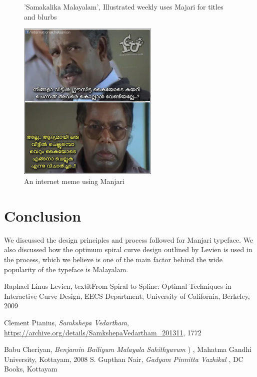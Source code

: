 \documentclass[11pt,twoside,a4paper,parskip=half]{scrartcl}
\begin{document}
\begin{figure}[h!]
\begin{subfigure}[b]{.45\textwidth}
	\end{subfigure}

	\caption{'Samakalika Malayalam', Illustrated weekly uses Majari for titles and blurbs}
	\label{manjari-sample-3}
\end{figure}

\begin{figure}[h!]
	\includegraphics[width=0.6\textwidth]{images/manjari-sample-4.png}
	\caption{An internet meme using Manjari}
	\label{manjari-sample-4}
\end{figure}

\clearpage
\section{Conclusion}

We discussed the design principles and process followed for Manjari typeface. We also discussed how the optimum spiral curve design outlined by Levien is used in the process, which we believe is one of the main factor behind the wide popularity of the typeface is Malayalam.


\begin{thebibliography}{11}

  Raphael Linus Levien,
  textit{From Spiral to Spline: Optimal Techniques in Interactive Curve Design},
  EECS Department, University of California, Berkeley,
  2009

 Clement Pianius,
 \emph{Samkshepa Vedartham},
 \url{https://archive.org/details/SamkshepaVedartham_201311},
 1772

 Babu Cheriyan, \textit{Benjamin Bailiyum Malayala Sahithyavum} {) }, Mahatma Gandhi University, Kottayam, 2008
	 S. Gupthan Nair, \textit{Gadyam Pinnitta Vazhikal}{ }, DC Books, Kottayam 

	
\end{thebibliography}
\end{document}
